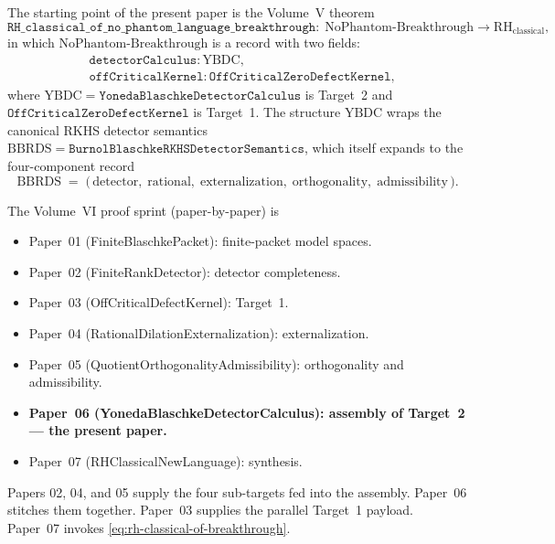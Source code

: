 \documentclass[12pt]{article}
\theoremstyle{plain}
\theoremstyle{definition}
\theoremstyle{remark}
\newcommand{\NoPhantom}{\mathrm{NoPhantom}}
\newcommand{\YBDC}{\mathrm{YBDC}}
\newcommand{\BBRDS}{\mathrm{BBRDS}}
\begin{document}
The starting point of the present paper is the Volume~V theorem
\begin{equation}
  \label{eq:rh-classical-of-breakthrough}
  \mathtt{RH\_classical\_of\_no\_phantom\_language\_breakthrough} : \;
  \NoPhantom\text{-}\mathrm{Breakthrough} \to \mathrm{RH}_{\mathrm{classical}},
\end{equation}
in which \(\NoPhantom\text{-}\mathrm{Breakthrough}\) is a record with two
fields:
\begin{align*}
  &\mathtt{detectorCalculus} : \YBDC, \\
  &\mathtt{offCriticalKernel} : \mathtt{OffCriticalZeroDefectKernel},
\end{align*}
where \(\YBDC = \mathtt{YonedaBlaschkeDetectorCalculus}\) is Target~2 and
\(\mathtt{OffCriticalZeroDefectKernel}\) is Target~1. The structure
\(\YBDC\) wraps the canonical RKHS detector semantics
\(\BBRDS = \mathtt{BurnolBlaschkeRKHSDetectorSemantics}\), which itself
expands to the four-component record
\begin{equation}
  \label{eq:bbrds}
  \BBRDS \;=\; \bigl(\,\mathrm{detector},\;\mathrm{rational},\;
    \mathrm{externalization},\;\mathrm{orthogonality},\;
    \mathrm{admissibility}\,\bigr).
\end{equation}

The Volume~VI proof sprint (paper-by-paper) is

\begin{itemize}[leftmargin=2em]
  \item Paper~01 (FiniteBlaschkePacket): finite-packet model spaces.
  \item Paper~02 (FiniteRankDetector): detector completeness.
  \item Paper~03 (OffCriticalDefectKernel): Target~1.
  \item Paper~04 (RationalDilationExternalization): externalization.
  \item Paper~05 (QuotientOrthogonalityAdmissibility): orthogonality and
        admissibility.
  \item \textbf{Paper~06 (YonedaBlaschkeDetectorCalculus): assembly of
        Target~2 — the present paper.}
  \item Paper~07 (RHClassicalNewLanguage): synthesis.
\end{itemize}

Papers 02, 04, and 05 supply the four sub-targets fed into the assembly.
Paper~06 stitches them together. Paper~03 supplies the parallel Target~1
payload. Paper~07 invokes \eqref{eq:rh-classical-of-breakthrough}.
\end{document}

